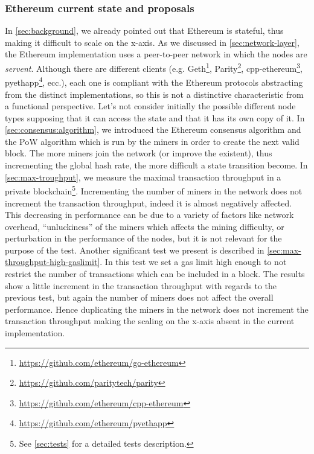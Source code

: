 \subsubsection{Ethereum current state and proposals}
\label{sec:x-axis-ethereum}
In \autoref{sec:background}, we already pointed out that Ethereum is stateful,
thus making it difficult to scale on the x-axis. As we discussed in
\autoref{sec:network-layer}, the Ethereum implementation uses a peer-to-peer
network in which the nodes are \emph{servent}. Although there are different
clients (e.g. Geth\footnote{\url{https://github.com/ethereum/go-ethereum}},
Parity\footnote{\url{https://github.com/paritytech/parity}},
cpp-ethereum\footnote{\url{https://github.com/ethereum/cpp-ethereum}},
pyethapp\footnote{\url{https://github.com/ethereum/pyethapp}}, ecc.), each one
is compliant with the Ethereum protocols abstracting from the distinct
implementations, so this is not a distinctive characteristic from a functional
perspective. Let's not consider initially the possible different node types
 supposing that it can access the state and that it has its
own copy of it. In \autoref{sec:consensus:algorithm}, we introduced the Ethereum
consensus algorithm and the PoW algorithm which is run by the miners in order to
create the next valid block. The more miners join the network (or improve the
existent), thus incrementing the global hash rate, the more difficult a state
transition become. In \autoref{sec:max-troughput}, we measure the maximal
transaction throughput in a private blockchain\footnote{See \autoref{sec:tests}
for a detailed tests description.}. Incrementing the number of miners in the
network does not increment the transaction throughput, indeed it is almost
negatively affected. This decreasing in performance can be due to a variety of
factors like network overhead, ``unluckiness'' of the miners which affects the
mining difficulty, or perturbation in the performance of the nodes, but it is
not relevant for the purpose of the test. Another significant test we present is
described in \autoref{sec:max-throughput-high-gaslimit}. In this test we set a
gas limit high enough to not restrict the number of transactions which can be
included in a block. The results show a little increment in the transaction
throughput with regards to the previous test, but again the number of miners
does not affect the overall performance. Hence duplicating the miners in the
network does not increment the transaction throughput making the scaling on the
x-axis absent in the current implementation.

